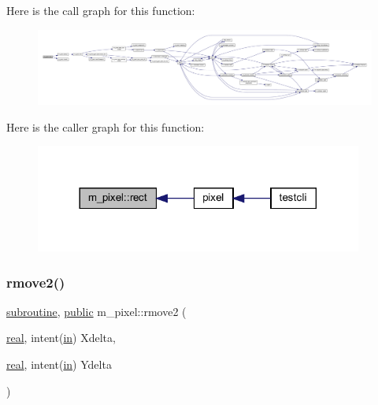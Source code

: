 Here is the call graph for this function\+:
\nopagebreak
\begin{figure}[H]
\begin{center}
\leavevmode
\includegraphics[width=350pt]{namespacem__pixel_a5435aa0d9d6048a62c09d7d90665b958_cgraph}
\end{center}
\end{figure}
Here is the caller graph for this function\+:
\nopagebreak
\begin{figure}[H]
\begin{center}
\leavevmode
\includegraphics[width=305pt]{namespacem__pixel_a5435aa0d9d6048a62c09d7d90665b958_icgraph}
\end{center}
\end{figure}
\mbox{\label{namespacem__pixel_a9b0fb9ccafe605fd6daf50c74347ed3a}} 
\subsubsection{\texorpdfstring{rmove2()}{rmove2()}}
{\footnotesize\ttfamily \hyperlink{M__stopwatch_83_8txt_acfbcff50169d691ff02d4a123ed70482}{subroutine}, \hyperlink{M__stopwatch_83_8txt_a2f74811300c361e53b430611a7d1769f}{public} m\+\_\+pixel\+::rmove2 (\begin{DoxyParamCaption}\item[{\hyperlink{read__watch_83_8txt_abdb62bde002f38ef75f810d3a905a823}{real}, intent(\hyperlink{M__journal_83_8txt_afce72651d1eed785a2132bee863b2f38}{in})}]{Xdelta,  }\item[{\hyperlink{read__watch_83_8txt_abdb62bde002f38ef75f810d3a905a823}{real}, intent(\hyperlink{M__journal_83_8txt_afce72651d1eed785a2132bee863b2f38}{in})}]{Ydelta }\end{DoxyParamCaption})}



